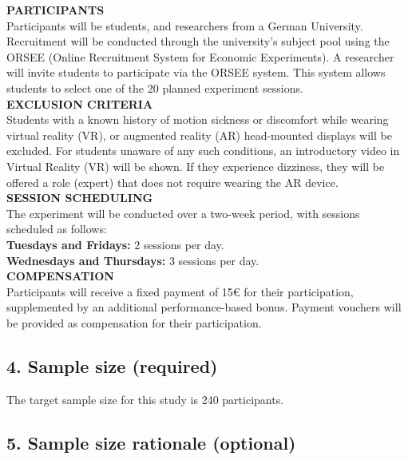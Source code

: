 \documentclass[A4,11pt]{article}
\renewcommand{\~}[1]{\tilde{#1}}
\renewcommand{\-}[1]{\overline{#1}}
\begin{document}
\textbf{PARTICIPANTS}\\
Participants will be students, and researchers from a German University. Recruitment will be conducted through the university's subject pool using the ORSEE (Online Recruitment System for Economic Experiments). A researcher will invite students to participate via the ORSEE system. This system allows students to select one of the 20 planned experiment sessions.\\

\textbf{EXCLUSION CRITERIA}\\
Students with a known history of motion sickness or discomfort while wearing virtual reality (VR), or augmented reality (AR) head-mounted displays will be excluded. For students unaware of any such conditions, an introductory video in Virtual Reality (VR) will be shown. If they experience dizziness, they will be offered a role (expert) that does not require wearing the AR device.\\

\textbf{SESSION SCHEDULING}\\
The experiment will be conducted over a two-week period, with sessions scheduled as follows:\\
\textbf{Tuesdays and Fridays:} 2 sessions per day.\\
\textbf{Wednesdays and Thursdays:} 3 sessions per day.\\

\textbf{COMPENSATION}\\
Participants will receive a fixed payment of 15€ for their participation, supplemented by an additional performance-based bonus. Payment vouchers will be provided as compensation for their participation.


\subsection*{4. Sample size (required) }

The target sample size for this study is 240 participants. 


\subsection*{5. Sample size rationale (optional)}
\end{document}
